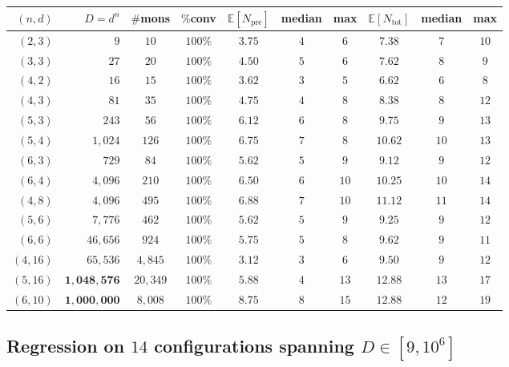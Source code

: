 \documentclass[11pt,a4paper]{article}
\begin{document}
\begin{center}
\begin{tabular}{rrcccccccc}
\toprule
$(n, d)$ & $D = d^n$ & $\#$mons & $\%$conv & $\mathbb{E}[N_{\text{pre}}]$ & median & max & $\mathbb{E}[N_{\text{tot}}]$ & median & max \\
\midrule
$(2, 3)$  & $9$         & $10$    & $100\%$ & $3.75$ & $4$  & $6$  & $7.38$  & $7$  & $10$ \\
$(3, 3)$  & $27$        & $20$    & $100\%$ & $4.50$ & $5$  & $6$  & $7.62$  & $8$  & $9$  \\
$(4, 2)$  & $16$        & $15$    & $100\%$ & $3.62$ & $3$  & $5$  & $6.62$  & $6$  & $8$  \\
$(4, 3)$  & $81$        & $35$    & $100\%$ & $4.75$ & $4$  & $8$  & $8.38$  & $8$  & $12$ \\
$(5, 3)$  & $243$       & $56$    & $100\%$ & $6.12$ & $6$  & $8$  & $9.75$  & $9$  & $13$ \\
$(5, 4)$  & $1{,}024$     & $126$   & $100\%$ & $6.75$ & $7$  & $8$  & $10.62$ & $10$ & $13$ \\
$(6, 3)$  & $729$       & $84$    & $100\%$ & $5.62$ & $5$  & $9$  & $9.12$  & $9$  & $12$ \\
$(6, 4)$  & $4{,}096$     & $210$   & $100\%$ & $6.50$ & $6$  & $10$ & $10.25$ & $10$ & $14$ \\
$(4, 8)$  & $4{,}096$     & $495$   & $100\%$ & $6.88$ & $7$  & $10$ & $11.12$ & $11$ & $14$ \\
$(5, 6)$  & $7{,}776$     & $462$   & $100\%$ & $5.62$ & $5$  & $9$  & $9.25$  & $9$  & $12$ \\
$(6, 6)$  & $46{,}656$    & $924$   & $100\%$ & $5.75$ & $5$  & $8$  & $9.62$  & $9$  & $11$ \\
$(4, 16)$ & $65{,}536$    & $4{,}845$ & $100\%$ & $\mathbf{3.12}$ & $3$  & $6$  & $9.50$  & $9$  & $12$ \\
$(5, 16)$ & $\mathbf{1{,}048{,}576}$ & $20{,}349$ & $100\%$ & $5.88$ & $4$  & $13$ & $12.88$ & $13$ & $17$ \\
$(6, 10)$ & $\mathbf{1{,}000{,}000}$ & $8{,}008$  & $100\%$ & $8.75$ & $8$  & $15$ & $12.88$ & $12$ & $19$ \\
\bottomrule
\end{tabular}
\end{center}

\subsection{Regression on $14$ configurations spanning $D \in [9, 10^6]$}
\end{document}
